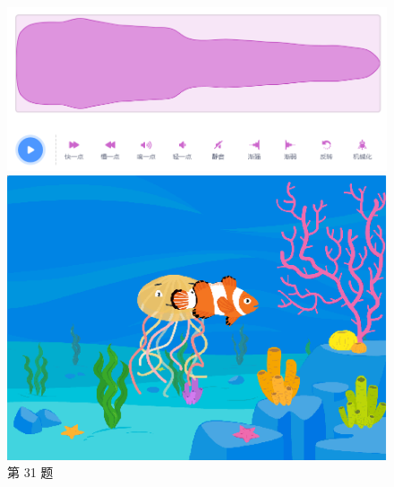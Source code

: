 \documentclass[10pt, a4paper]{article}
\begin{document}
\begin{enumerate}
        \begin{figure}[htbp]
            \centering
            \begin{minipage}[t]{.3\textwidth}
                \centering
                \includegraphics[width=\textwidth]{figure/33.png}
                \caption*{第 31 题}
            \end{minipage}
            \begin{minipage}[t]{.4\textwidth}
                \centering
                \begin{minipage}[t]{.4\textwidth}
                    \centering
                    \includegraphics[width=\textwidth]{figure/34-1.png}
                \end{minipage}
                \begin{minipage}[t]{.4\textwidth}
                    \centering

\end{minipage}
\end{minipage}
\end{figure}
\end{enumerate}
\end{document}
